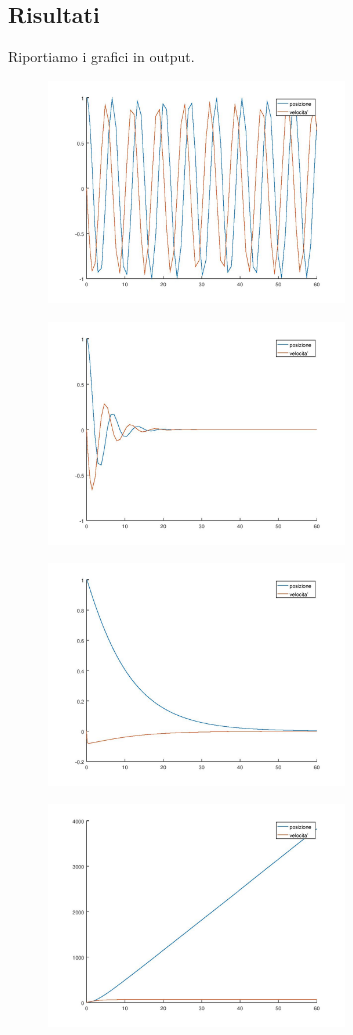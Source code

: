 \documentclass{article}
\begin{document}
	\subsection{Risultati}
	Riportiamo i grafici in output.\\
	\begin{figure}[htp!]
		\centering 
		\includegraphics[width=0.7\textwidth]{5_4_1.jpeg}
	\end{figure}
		\begin{figure}[htp!]
		\centering 
		\includegraphics[width=0.7\textwidth]{5_4_2.jpeg}
	\end{figure}
	\begin{figure}[htp!]
		\centering 
		\includegraphics[width=0.7\textwidth]{5_4_3.jpeg}
	\end{figure}
	\begin{figure}[htp!]
		\centering 
		\includegraphics[width=0.7\textwidth]{5_4_4.jpeg}
	\end{figure}
\end{document}
